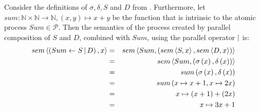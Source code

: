 \begin{example}
\label{exp:sem_parallel}
Consider the definitions of $\sigma, \delta, S$ and $D$ from . Furthermore, let $sum \colon \mathbb{N} \times \mathbb{N} \to \mathbb{N}, \left( x, y \right) \mapsto x + y$ be the function that is intrinsic to the atomic process $Sum \in \mathcal{P}$. Then the semantics of the process created by parallel composition of $S$ and $D$, combined with $Sum$, using the parallel operator $|$ is: 
  \begin{eqnarray*}
    sem \left\langle \left( Sum \gets S \, | \, D \right), x \right\rangle & = & sem \left\langle Sum, \left( sem \left\langle S, x \right\rangle, sem \left\langle D, x \right\rangle \right) \right\rangle \\
                                  & = & sem \left\langle Sum, \left( \sigma\left(x\right), \delta\left(x\right) \right) \right\rangle \\
                                  & = & sum \left( \sigma\left(x\right), \delta\left(x\right) \right) \\
                                  & = & sum \left( x \mapsto x+1, x \mapsto 2x \right) \\
                                  & = & x \mapsto \left( x+1 \right) + \left( 2x \right) \\
                                  & = & x \mapsto 3x + 1
  \end{eqnarray*}
  \hfill\qedsymbol
\end{example}



